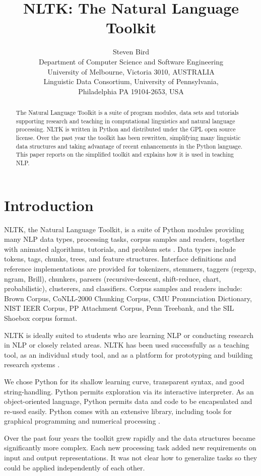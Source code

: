 \documentclass[11pt]{article}
\title{NLTK: The Natural Language Toolkit}
\author{Steven Bird\\[.5ex]
  Department of Computer Science and Software Engineering\\
  University of Melbourne, Victoria 3010, AUSTRALIA\\[.5ex]
  Linguistic Data Consortium, University of Pennsylvania,\\
  Philadelphia PA 19104-2653, USA}
\date{}
\begin{document}
\maketitle
\begin{abstract}
  The Natural Language Toolkit is a suite of program modules, data
  sets and tutorials supporting research and teaching in computational
  linguistics and natural language processing.  NLTK is written in
  Python and distributed under the GPL open source license.  Over the
  past year the toolkit has been rewritten, simplifying many
  linguistic data structures and taking advantage of recent
  enhancements in the Python language.  This paper reports on the
  simplified toolkit and explains how it is used in teaching NLP.
\end{abstract}

\section{Introduction}

NLTK, the Natural Language Toolkit, is a suite of Python modules
providing many NLP data types, processing tasks, corpus samples and
readers, together with animated algorithms, tutorials, and problem
sets \cite{LoperBird02}.  Data types include tokens, tags, chunks,
trees, and feature structures.  Interface definitions and reference
implementations are provided for tokenizers, stemmers, taggers
(regexp, ngram, Brill), chunkers, parsers (recursive-descent,
shift-reduce, chart, probabilistic), clusterers, and classifiers.
Corpus samples and readers include: Brown Corpus, CoNLL-2000 Chunking
Corpus, CMU Pronunciation Dictionary, NIST IEER Corpus, PP Attachment
Corpus, Penn Treebank, and the SIL Shoebox corpus format.

NLTK is ideally suited to students who are learning NLP or conducting
research in NLP or closely related areas.
NLTK has been used successfully as a
teaching tool, as an individual study tool, and as a platform for
prototyping and building research systems \cite{Liddy05,Satre05}.

We chose Python for its shallow learning curve, transparent syntax,
and good string-handling.  Python permits exploration via its
interactive interpreter.  As an object-oriented language, Python
permits data and code to be encapsulated and re-used easily.  Python
comes with an extensive library, including tools for graphical
programming and numerical processing \cite{Beasley06}.

Over the past four years the toolkit grew rapidly and the data
structures became significantly more complex.  Each new processing
task added new requirements on input and output
representations.  It was not clear how to generalize tasks so they
could be applied independently of each other.
\end{document}
